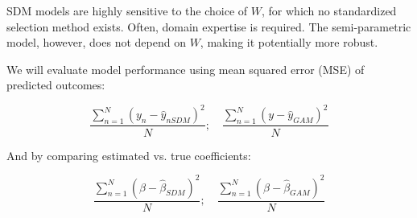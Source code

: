 
SDM models are highly sensitive to the choice of $W$, for which no standardized selection method exists. Often, domain expertise is required. The semi-parametric model, however, does not depend on $W$, making it potentially more robust.

We will evaluate model performance using mean squared error (MSE) of predicted outcomes:

\begin{equation}
	\frac{\sum_{n=1}^N(y_n-\hat{y}_{nSDM})^2}{N}; \quad \frac{\sum_{n=1}^N(y-\hat{y}_{GAM})^2}{N}
	\label{eq:pref}
\end{equation}

And by comparing estimated vs. true coefficients:

\begin{equation}
	\frac{\sum_{n=1}^N(\beta-\hat{\beta}_{SDM})^2}{N}; \quad \frac{\sum_{n=1}^N(\beta-\hat{\beta}_{GAM})^2}{N}
	\label{eq:pref2}
\end{equation}

